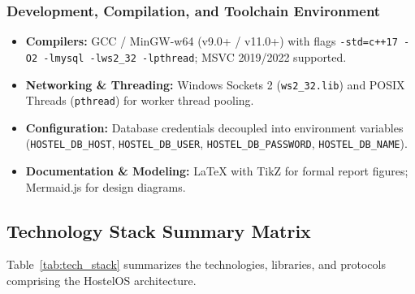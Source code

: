 \documentclass[12pt,a4paper]{article}
\begin{document}
\subsubsection{Development, Compilation, and Toolchain Environment}
\begin{itemize}
    \item \textbf{Compilers:} GCC / MinGW-w64 (v9.0+ / v11.0+) with flags \texttt{-std=c++17 -O2 -lmysql -lws2\_32 -lpthread}; MSVC 2019/2022 supported.
    \item \textbf{Networking \& Threading:} Windows Sockets 2 (\texttt{ws2\_32.lib}) and POSIX Threads (\texttt{pthread}) for worker thread pooling.
    \item \textbf{Configuration:} Database credentials decoupled into environment variables (\texttt{HOSTEL\_DB\_HOST}, \texttt{HOSTEL\_DB\_USER}, \texttt{HOSTEL\_DB\_PASSWORD}, \texttt{HOSTEL\_DB\_NAME}).
    \item \textbf{Documentation \& Modeling:} \LaTeX{} with TikZ for formal report figures; Mermaid.js for design diagrams.
\end{itemize}

\subsection{Technology Stack Summary Matrix}
\label{sec:tech_table}
Table~\ref{tab:tech_stack} summarizes the technologies, libraries, and protocols comprising the HostelOS architecture.
\end{document}
